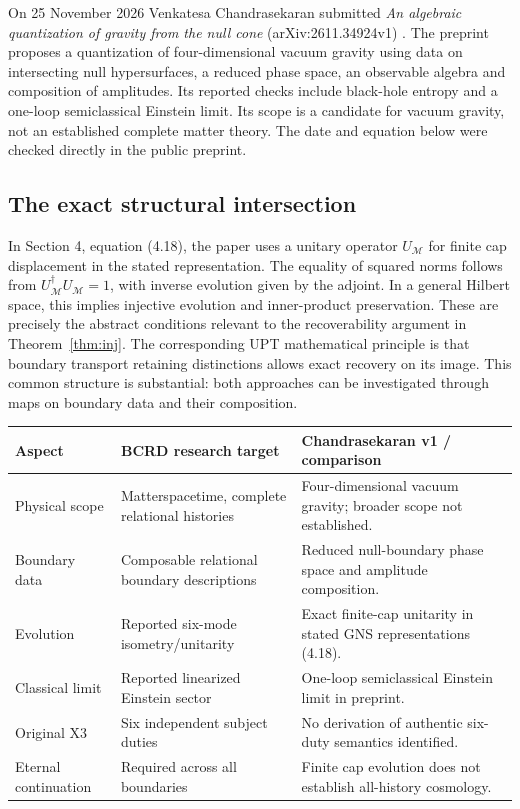 \documentclass[11pt,a4paper]{article}
\begin{document}
On 25 November 2026 Venkatesa Chandrasekaran submitted \emph{An algebraic quantization of gravity from the null cone} (arXiv:2611.34924v1) \cite{chandra}. The preprint proposes a quantization of four-dimensional vacuum gravity using data on intersecting null hypersurfaces, a reduced phase space, an observable algebra and composition of amplitudes. Its reported checks include black-hole entropy and a one-loop semiclassical Einstein limit. Its scope is a candidate for vacuum gravity, not an established complete matter theory. The date and equation below were checked directly in the public preprint.

\subsection{The exact structural intersection}
In Section 4, equation (4.18), the paper uses a unitary operator $U_{\mathcal M}$ for finite cap displacement in the stated representation. The equality of squared norms follows from $U_{\mathcal M}^\dagger U_{\mathcal M}=1$, with inverse evolution given by the adjoint. In a general Hilbert space, this implies injective evolution and inner-product preservation. These are precisely the abstract conditions relevant to the recoverability argument in Theorem~\ref{thm:inj}. The corresponding UPT mathematical principle is that boundary transport retaining distinctions allows exact recovery on its image. This common structure is substantial: both approaches can be investigated through maps on boundary data and their composition.

\begin{center}
\small
\begin{tabularx}{\linewidth}{@{}p{29mm}XX@{}}\toprule
Aspect & BCRD research target & Chandrasekaran v1 / comparison\\\midrule
Physical scope & Matterspacetime, complete relational histories & Four-dimensional vacuum gravity; broader scope not established.\\
Boundary data & Composable relational boundary descriptions & Reduced null-boundary phase space and amplitude composition.\\
Evolution & Reported six-mode isometry/unitarity & Exact finite-cap unitarity in stated GNS representations (4.18).\\
Classical limit & Reported linearized Einstein sector & One-loop semiclassical Einstein limit in preprint.\\
Original X3 & Six independent subject duties & No derivation of authentic six-duty semantics identified.\\
Eternal continuation & Required across all boundaries & Finite cap evolution does not establish all-history cosmology.\\\bottomrule
\end{tabularx}
\end{center}
\end{document}
